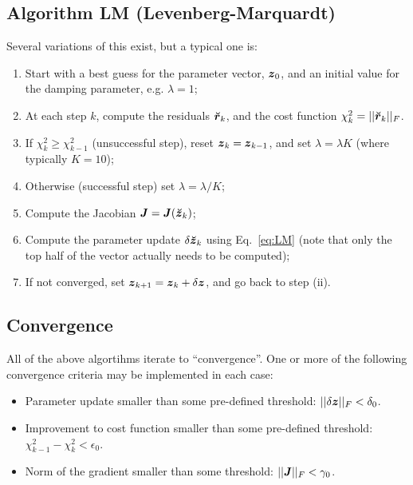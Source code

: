 \documentclass[useAMS,usenatbib]{mn2e}
\newcommand{\zz}{\bmath{z}}
\newcommand{\mat}[1]{{\bmath{#1}}}
\newcommand{\JJ}{\mat{J}} %
\newcommand{\AUG}[1]{\bmath{\breve{#1}}}
\newcommand{\Zz}{\AUG{z}}
\newcommand{\Rr}{\AUG{r}}
\numberwithin{equation}{section}
\begin{document}
\subsection{Algorithm LM (Levenberg-Marquardt)}

Several variations of this exist, but a typical one is:

\begin{enumerate}
\item Start with a best guess for the parameter vector, $\bmath{z}_0$, and an initial value
for the damping parameter, e.g. $\lambda=1$;
\item At each step $k$, compute the residuals $\Rr_k$, and the cost function $\chi^2_k=||\Rr_k||_F$.
\item If $\chi^2_k\ge\chi^2_{k-1}$ (unsuccessful step), reset $\zz_k=\zz_{k-1}$, and set $\lambda=\lambda K$ (where typically $K=10$);
\item Otherwise (successful step) set $\lambda=\lambda/K$;
\item Compute the Jacobian $\JJ=\JJ(\Zz_k)$;
\item Compute the parameter update $\delta\Zz_k$ using Eq.~\ref{eq:LM} (note that only the top half of the vector actually needs to be computed);
\item If not converged, set $\bmath{z}_{k+1}=\bmath{z}_k+\delta\zz$, and go back to step (ii).
\end{enumerate}

\subsection{Convergence}

All of the above algortihms iterate to ``convergence''. One or more of the following convergence criteria may be implemented in each case:

\begin{itemize}
\item Parameter update smaller than some pre-defined threshold: $||\delta \bmath{z}||_F<\delta_0$.
\item Improvement to cost function smaller than some pre-defined threshold: $\chi^2_{k-1}-\chi^2_{k}<\epsilon_0$.
\item Norm of the gradient smaller than some threshold:  $||\JJ||_F<\gamma_0$.
\end{itemize}



\label{lastpage}
\end{document}
